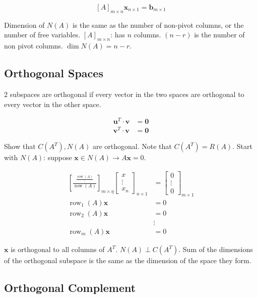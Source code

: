 \documentclass[main.tex]{subfiles}
\begin{document}
$$
[A]_{m \times n} \bm{x}_{n \times 1} = \bm{b}_{m \times 1}
$$

Dimension of $N(A)$ is the same as the number of non-pivot columns, or the number of free variables. $[A]_{m \times n}$: has $n$ columns. $(n-r)$ is the number of non pivot columns. $\operatorname{dim} N(A)=n-r$.

\subsection{Orthogonal Spaces}

2 subspaces are orthogonal if every vector in the two spaces are orthogonal to every vector in the other space.

$$
\begin{aligned}
\bm{u}^{T} \cdot \bm{v} &= \bm{0} \\
\bm{v}^{T} \cdot \bm{v} &= \bm{0}
\end{aligned}
$$

Show that $C\left(A^{T}\right), N(A)$ are orthogonal. Note that $C\left(A^{T}\right)=R(A)$. Start with $N(A)$: suppose $\bm{x} \in N(A) \rightarrow A \bm{x}=0$.

$$
\begin{aligned}
\left[\frac{\frac{\operatorname{row}(A)}{\vdots}}{{\operatorname{row}(A)}}\right]_{m \times \eta}\left[\begin{array}{c}
x \\
\vdots \\
x_{n}
\end{array}\right]_{n \times 1}&=\left[\begin{array}{c}
0 \\
\vdots \\
0
\end{array}\right]_{m \times 1} \\
\operatorname{row}_1(A) \bm{x}&=0 \\
\operatorname{row}_2(A) \bm{x}&=0 \\
&\vdots \\ 
\operatorname{row}_{m}(A)\bm{x}&=0
\end{aligned}
$$


$\bm{x}$ is orthogonal to all columns of $A^{T}$. $N(A) \perp C\left(A^{T}\right)$. Sum of the dimensions of the orthogonal subspace is the same as the dimension of the space they form.

\subsection{Orthogonal Complement}
\end{document}
